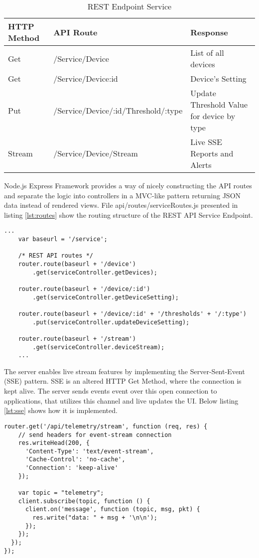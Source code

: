     \begin{table}[H]
        \centering
        \begin{tabular}{|l|l|p{5cm}|}
        \hline
        \textbf{HTTP Method}    & \textbf{API Route} & \textbf{Response} \\ \hline
        Get & /Service/Device & List of all devices  \\ \hline
        Get & /Service/Device:id & Device's Setting \\ \hline
        Put & /Service/Device/:id/Threshold/:type & Update Threshold Value for device by type  \\ \hline
        Stream & /Service/Device/Stream & Live SSE Reports and Alerts \\ \hline
        \end{tabular}
        \caption{REST Endpoint Service}
        \label{tbl:service}
    \end{table}

    Node.js Express Framework provides a way of nicely constructing the API routes and separate the logic into controllers in a MVC-like pattern returning JSON data instead of rendered views. File api/routes/serviceRoutes.js presented in listing \ref{lst:routes} show the routing structure of the REST API Service Endpoint. 

\begin{lstlisting}[style=js, caption=Node.js REST API Routes, label={lst:routes}]
    ...
    var baseurl = '/service';

    /* REST API routes */
    router.route(baseurl + '/device')
        .get(serviceController.getDevices);

    router.route(baseurl + '/device/:id')
        .get(serviceController.getDeviceSetting);

    router.route(baseurl + '/device/:id' + '/thresholds' + '/:type')
        .put(serviceController.updateDeviceSetting);

    router.route(baseurl + '/stream')
        .get(serviceController.deviceStream); 
    ...
\end{lstlisting}

The server enables live stream features by implementing the Server-Sent-Event (SSE) pattern. SSE is an altered HTTP Get Method, where the connection is kept alive. The server sends events event over this open connection to applications, that utilizes this channel and live updates the UI. Below listing \ref{lst:sse} shows how it is implemented.

\begin{lstlisting}[style=js, caption=Server Sent Event, label={lst:sse}]
    router.get('/api/telemetry/stream', function (req, res) {
    // send headers for event-stream connection
    res.writeHead(200, {
      'Content-Type': 'text/event-stream',
      'Cache-Control': 'no-cache',
      'Connection': 'keep-alive'
    });

    var topic = "telemetry";
    client.subscribe(topic, function () {
      client.on('message', function (topic, msg, pkt) {
        res.write("data: " + msg + '\n\n');
      });
    });
  });
});
\end{lstlisting}

